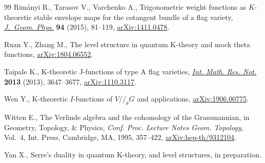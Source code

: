 \begin{thebibliography}{99}
Rim\'anyi R., Tarasov V., Varchenko A., Trigonometric weight functions as
 {$K$}-theoretic stable envelope maps for the cotangent bundle of a flag
 variety, \href{https://doi.org/10.1016/j.geomphys.2015.04.002}{\textit{J.~Geom. Phys.}} \textbf{94} (2015), 81--119,
 \href{https://arxiv.org/abs/1411.0478}{arXiv:1411.0478}.

Ruan Y., Zhang M., The level structure in quantum {K}-theory and mock theta
 functions, \href{https://arxiv.org/abs/1804.06552}{arXiv:1804.06552}.

Taipale K., K-theoretic {J}-functions of type {A} flag varieties, \href{https://doi.org/10.1093/imrn/rns156}{\textit{Int.
 Math. Res. Not.}} \textbf{2013} (2013), 3647--3677, \href{https://arxiv.org/abs/1110.3117}{arXiv:1110.3117}.

Wen Y., {K}-theoretic {$I$}-functions of {$V//_{\theta}G$} and applications,
 \href{https://arxiv.org/abs/1906.00775}{arXiv:1906.00775}.

Witten E., The {V}erlinde algebra and the cohomology of the {G}rassmannian, in
 Geometry, Topology, \& Physics, \textit{Conf. Proc. Lecture Notes Geom.
 Topology}, Vol.~4, Int. Press, Cambridge, MA, 1995, 357--422,
 \href{https://arxiv.org/abs/hep-th/9312104}{arXiv:hep-th/9312104}.

Yan X., Serre's duality in quantum {K}-theory, and level structures, in
 preparation.

\end{thebibliography}
